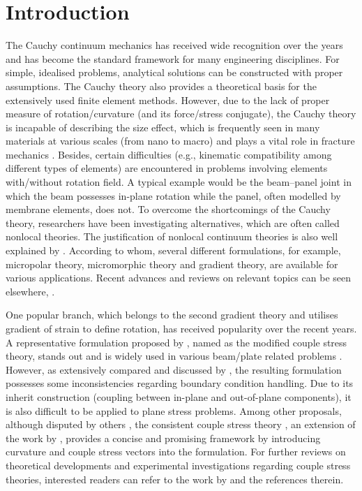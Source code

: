 \documentclass[3p,sort&compress,11pt,fleqn,review]{elsarticle}
\newcommand*{\alert}[1]{#1}
\begin{document}
\section{Introduction}
The Cauchy continuum mechanics has received wide recognition over the years and has become the standard framework for many engineering disciplines. For simple, idealised problems, analytical solutions can be constructed \citep[see, e.g.,][]{Timoshenko2010} with proper assumptions. The Cauchy theory also provides a theoretical basis for the extensively used finite element methods. However, due to the lack of proper measure of rotation/curvature (and its force/stress conjugate), the Cauchy theory is incapable of describing the size effect, which is frequently seen in many materials at various scales (from nano to macro) and plays a vital role in fracture mechanics \citep{Bazant1984}. Besides, certain difficulties (e.g., kinematic compatibility among different types of elements) are encountered in problems involving elements with/without rotation field. \alert{A typical example would be the beam--panel joint in which the beam possesses in-plane rotation while the panel, often modelled by membrane elements, does not.} To overcome the shortcomings of the Cauchy theory, researchers have been investigating alternatives, which are often called nonlocal theories. \alert{The justification of nonlocal continuum theories is also well explained by \citet{Eringen2004}. According to whom, several different formulations, for example, micropolar theory, micromorphic theory and gradient theory, are available for various applications.} Recent advances and reviews on relevant topics can be seen elsewhere, \citep[to name a few,][]{Maugin2010,Altenbach2011,Srinivasa2017,Thai2017,Faghidian2018,Shaat2017,Aifantis2011,Salehipour2015,Apuzzo2018,Lim2015,Shaat2020}.

\alert{One popular branch, which belongs to the second gradient theory and utilises gradient of strain to define rotation, has received popularity over the recent years. A representative formulation proposed by \citet{Yang2002}, named as the modified couple stress theory, stands out and is widely used in various beam/plate related problems \citep[see, e.g.,][]{Khakalo2018,Farokhi2018,Kim2019,Thanh2019,Thanh2019a,Fan2020,Yuan2020,Lu2017}. However, as extensively compared and discussed by \citet{Hadjesfandiari2016}, the resulting formulation possesses some inconsistencies regarding boundary condition handling. Due to its inherit construction (coupling between in-plane and out-of-plane components), it is also difficult to be applied to plane stress problems. Among other proposals, although disputed by others \citep{Neff2016}, the consistent couple stress theory \citep{Hadjesfandiari2011}, an extension of the work by \citet{Mindlin1968}, provides a concise and promising framework by introducing curvature and couple stress vectors into the formulation.} For further reviews on theoretical developments and experimental investigations regarding couple stress theories, interested readers can refer to the work by \citet{Pedgaonkar2021} and the references therein.
\end{document}
